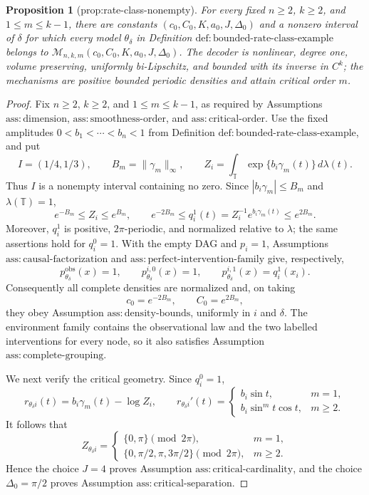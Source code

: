 \documentclass{article}
\newtheorem{proposition}{Proposition}
\begin{document}
\begin{proposition}[prop:rate-class-nonempty]\label{prop:rate-class-nonempty}
For every fixed \(n\ge2\), \(k\ge2\), and \(1\le m\le k-1\), there are constants \((c_0,C_0,K,a_0,J,\Delta_0)\) and a nonzero interval of \(\delta\) for which every model \(\theta_\delta\) in Definition \(\mathrm{def:bounded\text{-}rate\text{-}class\text{-}example}\) belongs to \(\mathcal M_{n,k,m}(c_0,C_0,K,a_0,J,\Delta_0)\). The decoder is nonlinear, degree one, volume preserving, uniformly bi-Lipschitz, and bounded with its inverse in \(C^k\); the mechanisms are positive bounded periodic densities and attain critical order \(m\).
\end{proposition}
\begin{proof}
Fix \(n\geq 2\), \(k\geq 2\), and \(1\leq m\leq k-1\), as required by Assumptions \(\mathrm{ass:dimension}\), \(\mathrm{ass:smoothness\text{-}order}\), and \(\mathrm{ass:critical\text{-}order}\).  Use the fixed amplitudes \(0<b_1<\cdots<b_n<1\) from Definition \(\mathrm{def:bounded\text{-}rate\text{-}class\text{-}example}\), and put
\[
 I=(1/4,1/3),\qquad B_m=\lVert\gamma_m\rVert_\infty,
 \qquad Z_i=\int_{\mathbb T}\exp\{b_i\gamma_m(t)\}\,d\lambda(t).
\]
Thus \(I\) is a nonempty interval containing no zero.  Since \(|b_i\gamma_m|\leq B_m\) and \(\lambda(\mathbb T)=1\),
\[
 e^{-B_m}\leq Z_i\leq e^{B_m},
 \qquad e^{-2B_m}\leq q_i^1(t)=Z_i^{-1}e^{b_i\gamma_m(t)}\leq e^{2B_m}.
\]
Moreover, \(q_i^1\) is positive, \(2\pi\)-periodic, and normalized relative to \(\lambda\); the same assertions hold for \(q_i^0=1\).  With the empty DAG and \(p_i=1\), Assumptions \(\mathrm{ass:causal\text{-}factorization}\) and \(\mathrm{ass:perfect\text{-}intervention\text{-}family}\) give, respectively,
\[
 p_{\theta_\delta}^{\mathrm{obs}}(x)=1,
 \qquad
 p_{\theta_\delta}^{i,0}(x)=1,
 \qquad
 p_{\theta_\delta}^{i,1}(x)=q_i^1(x_i).
\]
Consequently all complete densities are normalized and, on taking
\[
 c_0=e^{-2B_m},\qquad C_0=e^{2B_m},
\]
they obey Assumption \(\mathrm{ass:density\text{-}bounds}\), uniformly in \(i\) and \(\delta\).  The environment family contains the observational law and the two labelled interventions for every node, so it also satisfies Assumption \(\mathrm{ass:complete\text{-}grouping}\).

We next verify the critical geometry.  Since \(q_i^0=1\),
\[
 r_{\theta_\delta i}(t)=b_i\gamma_m(t)-\log Z_i,
 \qquad
 r_{\theta_\delta i}'(t)=
 \begin{cases}
 b_i\sin t,&m=1,\\
 b_i\sin^m t\cos t,&m\geq2.
 \end{cases}
\]
It follows that
\[
 Z_{\theta_\delta i}=
 \begin{cases}
 \{0,\pi\}\pmod {2\pi},&m=1,\\
 \{0,\pi/2,\pi,3\pi/2\}\pmod {2\pi},&m\geq2.
 \end{cases}
\]
Hence the choice \(J=4\) proves Assumption \(\mathrm{ass:critical\text{-}cardinality}\), and the choice \(\Delta_0=\pi/2\) proves Assumption \(\mathrm{ass:critical\text{-}separation}\).


\end{proof}
\end{document}
